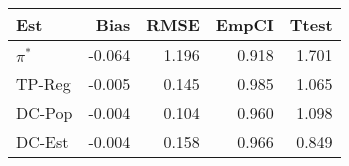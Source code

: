 
\begin{tabular}{lrrrr}
\toprule
Est & Bias & RMSE & EmpCI & Ttest\\
\midrule
$\pi^*$ & -0.064 & 1.196 & 0.918 & 1.701\\
TP-Reg & -0.005 & 0.145 & 0.985 & 1.065\\
DC-Pop & -0.004 & 0.104 & 0.960 & 1.098\\
DC-Est & -0.004 & 0.158 & 0.966 & 0.849\\
\bottomrule
\end{tabular}